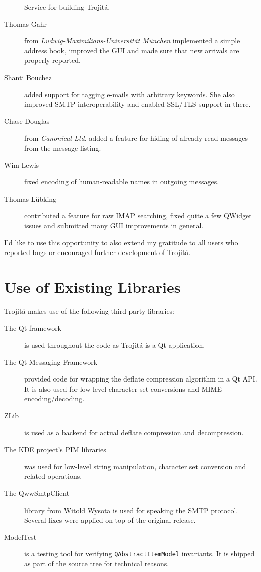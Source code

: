 \documentclass[trojita]{subfiles}
\begin{document}
\begin{description}
    Service for building Trojitá.
  \item[Thomas Gahr] from {\em Ludwig-Maximilians-Universität München} implemented a simple address book, improved the
    GUI and made sure that new arrivals are properly reported.
  \item[Shanti Bouchez] added support for tagging e-mails with arbitrary keywords.  She also improved SMTP
    interoperability and enabled SSL/TLS support in there.
  \item[Chase Douglas] from {\em Canonical Ltd.} added a feature for hiding of already read messages from the message
    listing.
  \item[Wim Lewis] fixed encoding of human-readable names in outgoing messages.
  \item[Thomas Lübking] contributed a feature for raw IMAP searching, fixed quite a few QWidget issues and submitted
    many GUI improvements in general.
\end{description}

I'd like to use this opportunity to also extend my gratitude to all users who reported bugs or encouraged further
development of Trojitá.

\section{Use of Existing Libraries}

Trojitá makes use of the following third party libraries:

\begin{description}
  \item[The Qt framework] is used throughout the code as Trojitá is a Qt application.
  \item[The Qt Messaging Framework] provided code for wrapping the deflate compression algorithm in a Qt API.  It is
    also used for low-level character set conversions and MIME encoding/decoding.
  \item[ZLib] is used as a backend for actual deflate compression and decompression.
  \item[The KDE project's PIM libraries] was used for low-level string manipulation, character set conversion and
    related operations.
  \item[The QwwSmtpClient] library from Witold Wysota is used for speaking the SMTP protocol.  Several fixes were
    applied on top of the original release.
  \item[ModelTest] is a testing tool for verifying {\tt QAbstractItemModel} invariants. It is shipped as part of the
    source tree for technical reasons.
\end{description}
\end{document}
